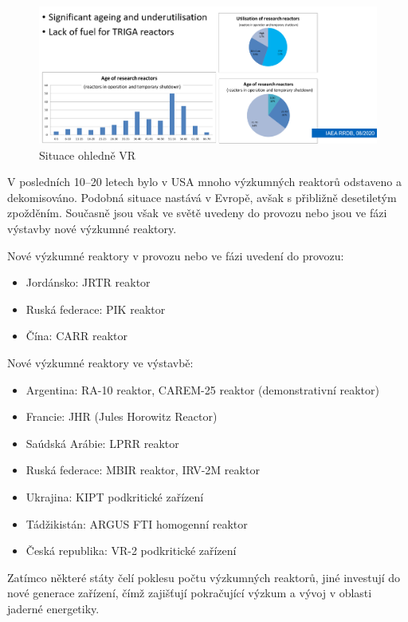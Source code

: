 \begin{figure}
    \centering
    \includegraphics[width=0.75\linewidth]{img/AgeOfRR.png}
    \caption{Situace ohledně VR}
    \label{fig:enter-label}
\end{figure}

V posledních 10--20 letech bylo v USA mnoho výzkumných reaktorů odstaveno a dekomisováno. Podobná situace nastává v Evropě, avšak s přibližně desetiletým zpožděním. Současně jsou však ve světě uvedeny do provozu nebo jsou ve fázi výstavby nové výzkumné reaktory.

Nové výzkumné reaktory v provozu nebo ve fázi uvedení do provozu:

\begin{itemize}
    \item Jordánsko: JRTR reaktor
    \item Ruská federace: PIK reaktor
    \item Čína: CARR reaktor
\end{itemize}

Nové výzkumné reaktory ve výstavbě:

\begin{itemize}
    \item Argentina: RA-10 reaktor, CAREM-25 reaktor (demonstrativní reaktor)
    \item Francie: JHR (Jules Horowitz Reactor)
    \item Saúdská Arábie: LPRR reaktor
    \item Ruská federace: MBIR reaktor, IRV-2M reaktor
    \item Ukrajina: KIPT podkritické zařízení
    \item Tádžikistán: ARGUS FTI homogenní reaktor
    \item Česká republika: VR-2 podkritické zařízení
\end{itemize}

Zatímco některé státy čelí poklesu počtu výzkumných reaktorů, jiné investují do nové generace zařízení, čímž zajišťují pokračující výzkum a vývoj v oblasti jaderné energetiky.
